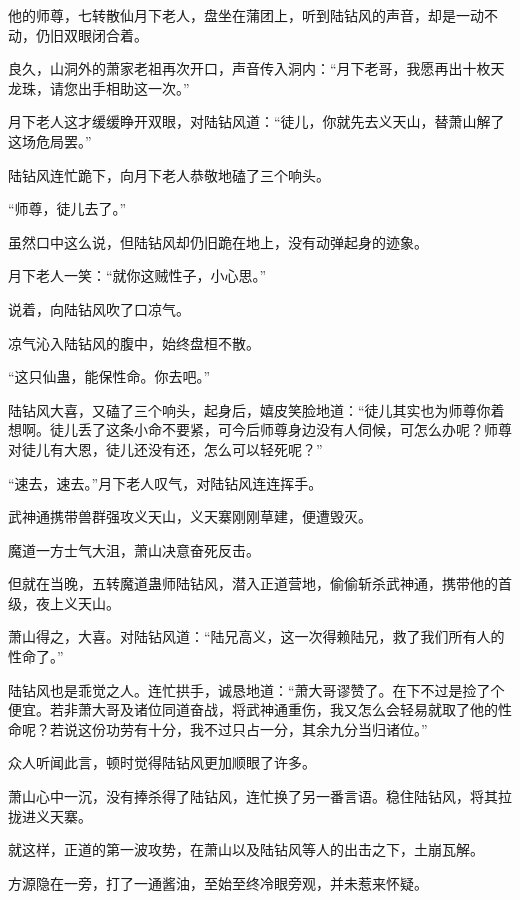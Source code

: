 
\begin{this_body}

他的师尊，七转散仙月下老人，盘坐在蒲团上，听到陆钻风的声音，却是一动不动，仍旧双眼闭合着。

良久，山洞外的萧家老祖再次开口，声音传入洞内：“月下老哥，我愿再出十枚天龙珠，请您出手相助这一次。”

月下老人这才缓缓睁开双眼，对陆钻风道：“徒儿，你就先去义天山，替萧山解了这场危局罢。”

陆钻风连忙跪下，向月下老人恭敬地磕了三个响头。

“师尊，徒儿去了。”

虽然口中这么说，但陆钻风却仍旧跪在地上，没有动弹起身的迹象。

月下老人一笑：“就你这贼性子，小心思。”

说着，向陆钻风吹了口凉气。

凉气沁入陆钻风的腹中，始终盘桓不散。

“这只仙蛊，能保性命。你去吧。”

陆钻风大喜，又磕了三个响头，起身后，嬉皮笑脸地道：“徒儿其实也为师尊你着想啊。徒儿丢了这条小命不要紧，可今后师尊身边没有人伺候，可怎么办呢？师尊对徒儿有大恩，徒儿还没有还，怎么可以轻死呢？”

“速去，速去。”月下老人叹气，对陆钻风连连挥手。

武神通携带兽群强攻义天山，义天寨刚刚草建，便遭毁灭。

魔道一方士气大沮，萧山决意奋死反击。

但就在当晚，五转魔道蛊师陆钻风，潜入正道营地，偷偷斩杀武神通，携带他的首级，夜上义天山。

萧山得之，大喜。对陆钻风道：“陆兄高义，这一次得赖陆兄，救了我们所有人的性命了。”

陆钻风也是乖觉之人。连忙拱手，诚恳地道：“萧大哥谬赞了。在下不过是捡了个便宜。若非萧大哥及诸位同道奋战，将武神通重伤，我又怎么会轻易就取了他的性命呢？若说这份功劳有十分，我不过只占一分，其余九分当归诸位。”

众人听闻此言，顿时觉得陆钻风更加顺眼了许多。

萧山心中一沉，没有捧杀得了陆钻风，连忙换了另一番言语。稳住陆钻风，将其拉拢进义天寨。

就这样，正道的第一波攻势，在萧山以及陆钻风等人的出击之下，土崩瓦解。

方源隐在一旁，打了一通酱油，至始至终冷眼旁观，并未惹来怀疑。


\end{this_body}
